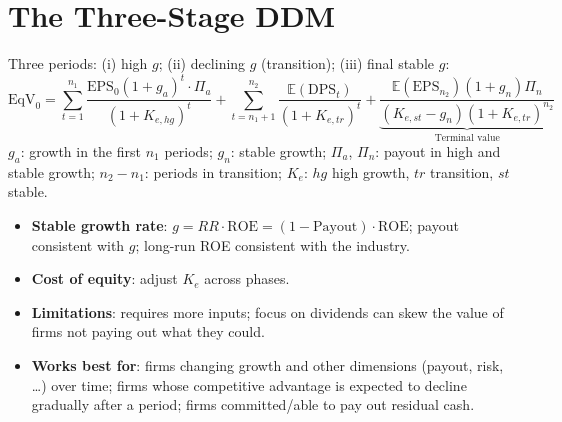 \section{The Three-Stage DDM}

\begin{keybox}
Three periods: (i) high $g$; (ii) declining $g$ (transition); (iii) final stable $g$:
\[
\text{EqV}_0=\sum_{t=1}^{n_1}\frac{\text{EPS}_0(1+g_a)^t\cdot\Pi_a}{(1+K_{e,hg})^t}+\sum_{t=n_1+1}^{n_2}\frac{\mathbb{E}(\text{DPS}_t)}{(1+K_{e,tr})^t}+\underbrace{\frac{\mathbb{E}(\text{EPS}_{n_2})(1+g_n)\Pi_n}{(K_{e,st}-g_n)(1+K_{e,tr})^{n_2}}}_{\text{Terminal value}}
\]
$g_a$: growth in the first $n_1$ periods; $g_n$: stable growth; $\Pi_a$, $\Pi_n$: payout in high and stable growth; $n_2-n_1$: periods in transition; $K_e$: $hg$ high growth, $tr$ transition, $st$ stable.
\end{keybox}
\begin{itemize}
  \item \textbf{Stable growth rate}: $g=RR\cdot\text{ROE}=(1-\text{Payout})\cdot\text{ROE}$; payout consistent with $g$; long-run ROE consistent with the industry.
  \item \textbf{Cost of equity}: adjust $K_e$ across phases.
  \item \textbf{Limitations}: requires more inputs; focus on dividends can skew the value of firms not paying out what they could.
  \item \textbf{Works best for}: firms changing growth and other dimensions (payout, risk, \dots) over time; firms whose competitive advantage is expected to decline gradually after a period; firms committed/able to pay out residual cash.
\end{itemize}

